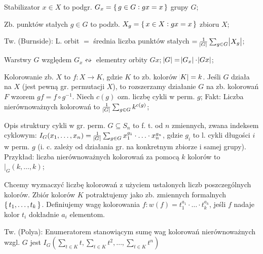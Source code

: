 Stabilizator $x \in X$ to podgr. $G_x = \set{g\in G: gx = x}$ grupy $G$;

Zb. punktów stałych $g \in G$ to podzb. $X_g = \set{x\in X: gx=x}$ zbioru $X$;

Tw. (Burnside): L. orbit $=$ średnia liczba punktów stałych
  $=\frac{1}{\abs{G}}\sum_{g\in G}\abs{X_g}$;

Warstwy $G$ względem $G_x \leftrightsquigarrow$ elementry orbity $Gx$;
$\abs{G} = \abs{G_x} \cdot \abs{Gx}$;

Kolorowanie zb. $X$ to $f: X\rightarrow K$, gdzie $K$ to zb. kolorów
  $\abs{K} = k$. Jeśli $G$ działa na $X$ (jest pewną gr. permutacji $X$), to
  rozszerzamy działanie $G$ na zb. kolorowań $F$ wzorem $gf=f\circ g^{-1}$.
  Niech $c(g)$ ozn. liczbę cykli w perm. $g$; Fakt: Liczba nierównoważnych
  kolorowań to $\frac{1}{\abs{G}}\sum_{g\in G}k^{c(g)}$;

Opis struktury cykli w gr. perm. $G \subseteq S_n$ to f. t. od $n$ zmiennych,
  zwana indeksem cyklowym: $I_G(x_1,\ldots,x_n)=
  \frac{1}{\abs{G}}\sum_{g\in G}x_1^{g_1}\cdot\ldots\cdot x_n^{g_n}$, gdzie
  $g_i$ to l. cykli długości $i$ w perm. $g$ (i. c. zależy od działania gr.
  na konkretnym zbiorze i samej grupy). Przykład: liczba nierównoważnych
  kolorowań za pomocą $k$ kolorów to $|_G(k,\ldots,k)$;

Chcemy wyznaczyć liczbę kolorowań z użyciem ustalonych liczb
  poszczególnych kolorów. Zbiór kolorów $K$ potraktujemy jako zb. zmiennych
  formalnych $\set{t_1,\ldots,t_k}$. Definiujemy wagę kolorowania
  $f: w(f) = t_1^{a_1}\cdot\ldots\cdot t_k^{a_k}$, jeśli $f$ nadaje kolor $t_i$
  dokładnie $a_i$ elementom.

Tw. (Polya): Enumeratorem stanowiącym sumę wag kolorowań nierównoważnych wzgl.
  $G$ jest $I_G(\sum_{t\in K}t, \sum_{t\in K}t^2, \ldots, \sum_{t\in K}t^n)$
